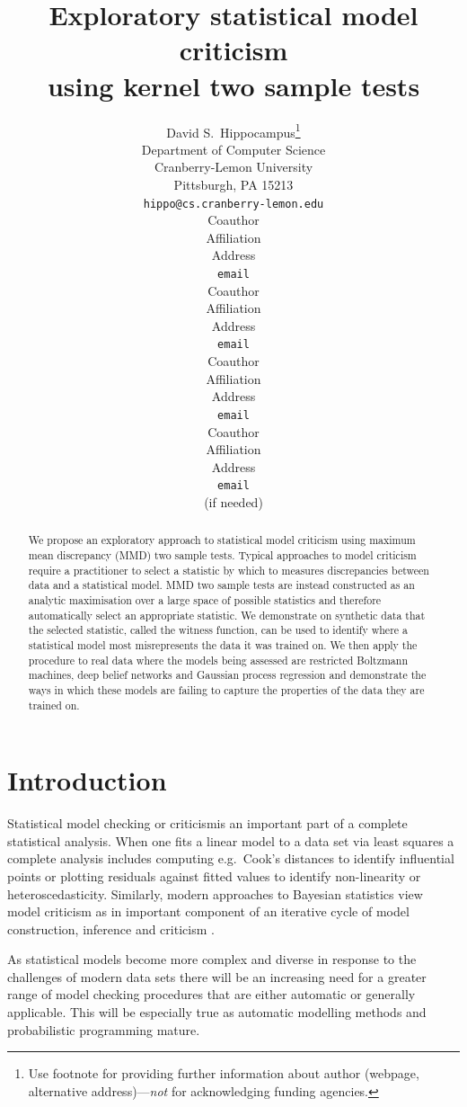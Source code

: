 \documentclass{article} %
\title{Exploratory statistical model criticism\\using kernel two sample tests}
\author{
David S.~Hippocampus\thanks{ Use footnote for providing further information
about author (webpage, alternative address)---\emph{not} for acknowledging
funding agencies.} \\
Department of Computer Science\\
Cranberry-Lemon University\\
Pittsburgh, PA 15213 \\
\texttt{hippo@cs.cranberry-lemon.edu} \\
\And
Coauthor \\
Affiliation \\
Address \\
\texttt{email} \\
\AND
Coauthor \\
Affiliation \\
Address \\
\texttt{email} \\
\And
Coauthor \\
Affiliation \\
Address \\
\texttt{email} \\
\And
Coauthor \\
Affiliation \\
Address \\
\texttt{email} \\
(if needed)\\
}
\def\eg{e.g.\ }
\begin{document}
 

\maketitle

\begin{abstract} 
We propose an exploratory approach to statistical model criticism using maximum mean discrepancy (MMD) two sample tests.
Typical approaches to model criticism require a practitioner to select a statistic by which to measures discrepancies between data and a statistical model.
MMD two sample tests are instead constructed as an analytic maximisation over a large space of possible statistics and therefore automatically select an appropriate statistic.
We demonstrate on synthetic data that the selected statistic, called the witness function, can be used to identify where a statistical model most misrepresents the data it was trained on.
We then apply the procedure to real data where the models being assessed are restricted Boltzmann machines, deep belief networks and Gaussian process regression and demonstrate the ways in which these models are failing to capture the properties of the data they are trained on.
\end{abstract} 

\allowdisplaybreaks

\section{Introduction}

Statistical model checking or criticism\footnotemark is an important part of a complete statistical analysis.
When one fits a linear model to a data set via least squares a complete analysis includes computing \eg Cook's distances \cite{Cook1982-eq} to identify influential points or plotting residuals against fitted values to identify non-linearity or heteroscedasticity.
Similarly, modern approaches to Bayesian statistics view model criticism as in important component of an iterative cycle of model construction, inference and criticism \citep{Gelman2013-st}.

As statistical models become more complex and diverse in response to the challenges of modern data sets there will be an increasing need for a greater range of model checking procedures that are either automatic or generally applicable.
This will be especially true as automatic modelling methods \citep[e.g.][]{Grosse2012-zf, Thornton2013-zg, Lloyd2014-ABCD} and probabilistic programming \citep[e.g.][]{Goodman2012-pf, stan-software:2014} mature.
\end{document}
